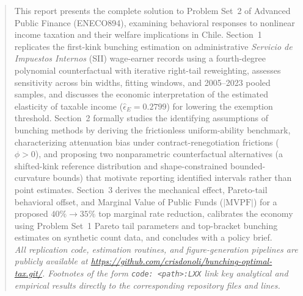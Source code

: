 \documentclass[11pt,a4paper, twoside]{article}
\begin{document}
\begin{abstract}
\noindent This report presents the complete solution to Problem Set~2 of Advanced Public Finance (ENECO894), examining behavioral responses to nonlinear income taxation and their welfare implications in Chile. Section~1 replicates the first-kink bunching estimation on administrative \textit{Servicio de Impuestos Internos} (SII) wage-earner records using a fourth-degree polynomial counterfactual with iterative right-tail reweighting, assesses sensitivity across bin widths, fitting windows, and 2005--2023 pooled samples, and discusses the economic interpretation of the estimated elasticity of taxable income ($\hat{\epsilon}_E = 0.2799$) for lowering the exemption threshold. Section~2 formally studies the identifying assumptions of bunching methods by deriving the frictionless uniform-ability benchmark, characterizing attenuation bias under contract-renegotiation frictions ($\phi > 0$), and proposing two nonparametric counterfactual alternatives (a shifted-kink reference distribution and shape-constrained bounded-curvature bounds) that motivate reporting identified intervals rather than point estimates. Section~3 derives the mechanical effect, Pareto-tail behavioral offset, and Marginal Value of Public Funds ($|\mathrm{MVPF}|$) for a proposed $40\% \to 35\%$ top marginal rate reduction, calibrates the economy using Problem Set~1 Pareto tail parameters and top-bracket bunching estimates on synthetic count data, and concludes with a policy brief.
\vspace{20mm}\\
\noindent \textit{All replication code, estimation routines, and figure-generation pipelines are publicly available at \url{https://github.com/crisdonoli/bunching-optimal-tax.git/}. Footnotes of the form \texttt{code: <path>:LXX} link key analytical and empirical results directly to the corresponding repository files and lines.}
\end{abstract}

\newpage


\newpage


\newpage


\newpage
\nocite{*}
\printbibliography[title={References}]

\newpage
\appendix

\clearpage
\end{document}
